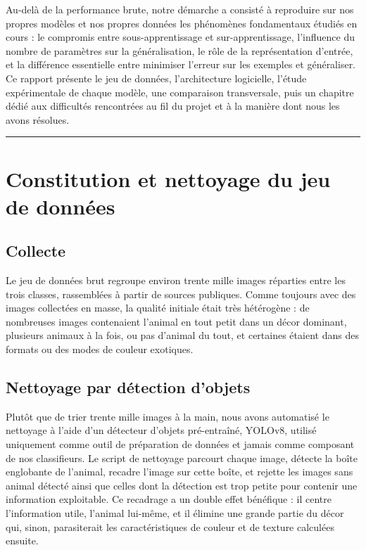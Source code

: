 \documentclass[11pt,a4paper]{report}
\begin{document}
Au-delà de la performance brute, notre démarche a consisté à reproduire
sur nos propres modèles et nos propres données les phénomènes
fondamentaux étudiés en cours : le compromis entre sous-apprentissage et
sur-apprentissage, l'influence du nombre de paramètres sur la
généralisation, le rôle de la représentation d'entrée, et la différence
essentielle entre minimiser l'erreur sur les exemples et généraliser. Ce
rapport présente le jeu de données, l'architecture logicielle, l'étude
expérimentale de chaque modèle, une comparaison transversale, puis un
chapitre dédié aux difficultés rencontrées au fil du projet et à la
manière dont nous les avons résolues.

\begin{center}\rule{0.5\linewidth}{0.5pt}\end{center}

\hypertarget{constitution-et-nettoyage-du-jeu-de-donnuxe9es}{%
\chapter{Constitution et nettoyage du jeu de
données}\label{constitution-et-nettoyage-du-jeu-de-donnuxe9es}}

\hypertarget{collecte}{%
\section{Collecte}\label{collecte}}

Le jeu de données brut regroupe environ trente mille images réparties
entre les trois classes, rassemblées à partir de sources publiques.
Comme toujours avec des images collectées en masse, la qualité initiale
était très hétérogène : de nombreuses images contenaient l'animal en
tout petit dans un décor dominant, plusieurs animaux à la fois, ou pas
d'animal du tout, et certaines étaient dans des formats ou des modes de
couleur exotiques.

\hypertarget{nettoyage-par-duxe9tection-dobjets}{%
\section{Nettoyage par détection
d'objets}\label{nettoyage-par-duxe9tection-dobjets}}

Plutôt que de trier trente mille images à la main, nous avons automatisé
le nettoyage à l'aide d'un détecteur d'objets pré-entraîné, YOLOv8,
utilisé uniquement comme outil de préparation de données et jamais comme
composant de nos classifieurs. Le script de nettoyage parcourt chaque
image, détecte la boîte englobante de l'animal, recadre l'image sur
cette boîte, et rejette les images sans animal détecté ainsi que celles
dont la détection est trop petite pour contenir une information
exploitable. Ce recadrage a un double effet bénéfique : il centre
l'information utile, l'animal lui-même, et il élimine une grande partie
du décor qui, sinon, parasiterait les caractéristiques de couleur et de
texture calculées ensuite.
\end{document}
